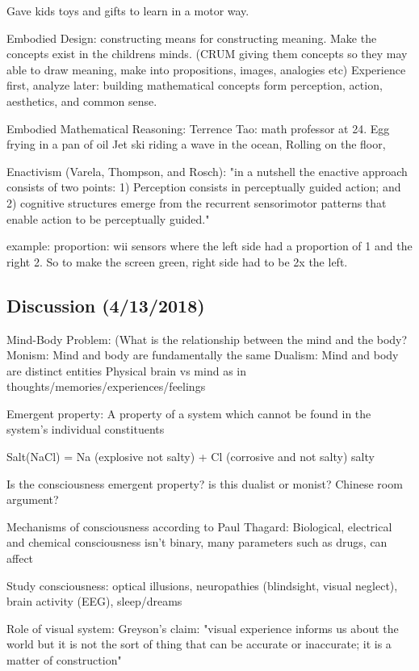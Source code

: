 \documentclass{article}
\begin{document}
Gave kids toys and gifts to learn in a motor way. 

Embodied Design: constructing means for constructing meaning. Make the concepts exist in the childrens minds. 
(CRUM giving them concepts so they may able to draw meaning, make into propositions, images, analogies etc) 
Experience first, analyze later: building mathematical concepts form perception, action, aesthetics, and common sense. 

Embodied Mathematical Reasoning: 
Terrence Tao: math professor at 24. 
Egg frying in a pan of oil
Jet ski riding  a wave in the ocean, 
Rolling on the floor, 

Enactivism (Varela, Thompson, and Rosch): "in a nutshell the enactive approach consists of two points:
1) Perception consists in perceptually guided action; and
2) cognitive structures emerge from the recurrent sensorimotor patterns that enable action to be perceptually guided."

example: proportion: wii sensors where the left side had a proportion of 1 and the right 2. So to make the screen green, right side had to be 2x the left. \\


\subsection{Discussion (4/13/2018)}
Mind-Body Problem: (What is the relationship between the mind and the body?
Monism: Mind and body are fundamentally the same
Dualism: Mind and body are distinct entities
Physical brain vs mind as in thoughts/memories/experiences/feelings

Emergent property: A property of a system which cannot be found in the system's individual constituents

Salt(NaCl) = Na (explosive not salty) + Cl (corrosive and not salty) 
salty

Is the consciousness emergent property? is this dualist or monist? 
Chinese room argument?

Mechanisms of consciousness according to Paul Thagard: Biological, electrical and chemical
consciousness isn't binary, many parameters such as drugs, can affect

Study consciousness: optical illusions, neuropathies (blindsight, visual neglect), brain activity (EEG), sleep/dreams

Role of visual system: Greyson's claim: "visual experience informs us about the world but it is not the sort of thing that can be accurate or inaccurate; it is a matter of construction"
\end{document}
